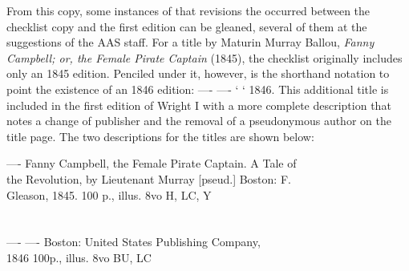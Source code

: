 From this copy, some instances of that revisions the occurred between the checklist copy and the first edition can be gleaned, several of them at the suggestions of the AAS staff. For a title by Maturin Murray Ballou, \textit{Fanny Campbell; or, the Female Pirate Captain} (1845), the checklist originally includes only an 1845 edition. Penciled under it, however, is the shorthand notation to point the existence of an 1846 edition: ---- ---- `  ` 1846. This additional title is included in the first edition of Wright I with a more complete description that notes a change of publisher and the removal of a pseudonymous author on the title page. The two descriptions for the titles are shown below: 
\begin{displayquote}
---- Fanny Campbell, the Female Pirate Captain. A Tale of \\
\hspace*{2 pc}the Revolution, by Lieutenant Murray [pseud.] Boston: F.
\\
\hspace*{2 pc}Gleason, 1845. 100 p., illus. 8vo  \hspace*{6 pc} H, LC, Y
\\
\hspace*{2 pc}{\small Printed in double columns.}
\\
\\
---- ---- Boston: United States Publishing Company,
\\
\hspace*{2 pc} 1846 100p., illus. 8vo \hspace*{6 pc}     BU, LC
\\
\hspace*{2 pc}{\small Printed in double columns.}\autocite[16]{wright_american_1939}
\end{displayquote}


